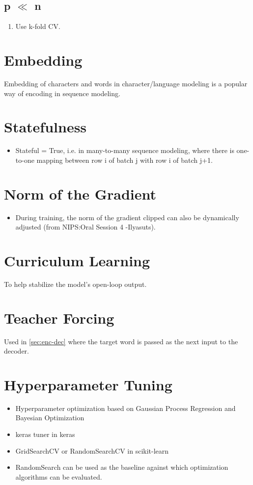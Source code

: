 \documentclass[a4paper, 12pt]{report}
\begin{document}
\subsection{p ${\ll}$ n}
\begin{enumerate}
\item Use k-fold CV.
\end{enumerate}

\section{Embedding}
Embedding of characters and words in character/language modeling is a popular way of encoding in sequence modeling.

\section{Statefulness}
\begin{itemize}
\item Stateful = True, i.e. in many-to-many sequence modeling, where there is one-to-one mapping between row i of batch j with row i of batch j+1.
\end{itemize}

\section{Norm of the Gradient}
\begin{itemize}
\item During training, the norm of the gradient clipped can also be dynamically adjusted ({\color{green}from NIPS:Oral Session 4 -Ilyasuts}).
\end{itemize}

\section{Curriculum Learning}
To help stabilize the model's open-loop output.

\section{Teacher Forcing}
Used in  \autoref{sec:enc-dec} where the target word is passed as the next input to the decoder.

\section{Hyperparameter Tuning}
\begin{itemize}
\item Hyperparameter optimization based on Gaussian Process Regression and Bayesian Optimization
\item keras tuner in keras
\item GridSearchCV or RandomSearchCV in scikit-learn
\item RandomSearch can be used as the baseline against which optimization algorithms can be evaluated.
\end{itemize}
\end{document}
